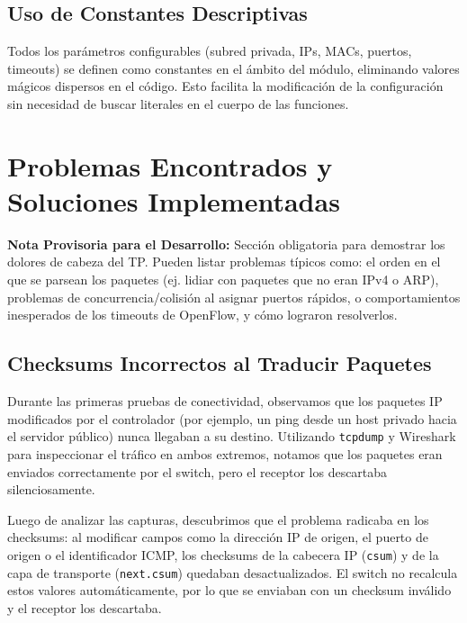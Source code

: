 \documentclass[11pt, a4paper]{article}
\begin{document}
\subsection{Uso de Constantes Descriptivas}
\label{subsec:constantes}

Todos los parámetros configurables (subred privada, IPs, MACs, puertos, timeouts) se definen como constantes en el ámbito del módulo, eliminando valores mágicos dispersos en el código. Esto facilita la modificación de la configuración sin necesidad de buscar literales en el cuerpo de las funciones.


\section{Problemas Encontrados y Soluciones Implementadas}
\label{sec:problemas_soluciones}

\begin{small}
\color{blue}
\textbf{Nota Provisoria para el Desarrollo:} 
Sección obligatoria para demostrar los dolores de cabeza del TP. Pueden listar problemas típicos como: el orden en el que se parsean los paquetes (ej. lidiar con paquetes que no eran IPv4 o ARP), problemas de concurrencia/colisión al asignar puertos rápidos, o comportamientos inesperados de los timeouts de OpenFlow, y cómo lograron resolverlos.
\end{small}

\vspace{0.5cm}

\subsection{Checksums Incorrectos al Traducir Paquetes}

Durante las primeras pruebas de conectividad, observamos que los paquetes IP modificados por el controlador (por ejemplo, un ping desde un host privado hacia el servidor público) nunca llegaban a su destino. Utilizando \texttt{tcpdump} y Wireshark para inspeccionar el tráfico en ambos extremos, notamos que los paquetes eran enviados correctamente por el switch, pero el receptor los descartaba silenciosamente.

Luego de analizar las capturas, descubrimos que el problema radicaba en los checksums: al modificar campos como la dirección IP de origen, el puerto de origen o el identificador ICMP, los checksums de la cabecera IP (\texttt{csum}) y de la capa de transporte (\texttt{next.csum}) quedaban desactualizados. El switch no recalcula estos valores automáticamente, por lo que se enviaban con un checksum inválido y el receptor los descartaba.
\end{document}
